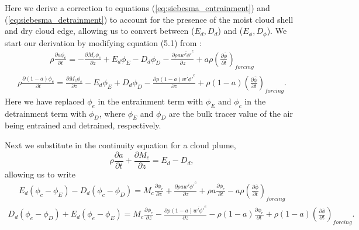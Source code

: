 \documentclass[draft,grl]{agutex}
\begin{document}
\begin{article}
Here we derive a correction to equations (\ref{eq:siebesma_entrainment}) and 
(\ref{eq:siebesma_detrainment}) to account for the presence of the moist cloud 
shell and dry cloud edge, allowing us to convert between ($E_d, D_d$) and 
($E_\phi, D_\phi$).  We start our derivation by modifying equation (5.1) from
\cite{Siebesma1995}:
\begin{eqnarray}
  \label{eq:entrainment_derivation_1}
    \rho \frac{\partial a \phi_c}{\partial t} 
    = - \frac{\partial M_c \phi_c}{\partial z} 
    + E_d \phi_E - D_d \phi_D
    - \frac{\partial \rho a \overline{w' \phi'}^c}{\partial z} 
    + a \rho \left(\frac{\partial \bar{\phi}}{\partial t}\right)_{forcing}
\end{eqnarray}
\begin{eqnarray}
  \label{eq:detrainment_derivation_1}
    \rho \frac{\partial (1 - a) \phi_e}{\partial t}
    = \frac{\partial M_c \phi_e}{\partial z} 
    - E_d \phi_E + D_d \phi_D
    - \frac{\partial \rho (1 - a) \overline{w' \phi'}^e}{\partial z} 
    + \rho (1 - a) \left(\frac{\partial \bar{\phi}}{\partial t}\right)_{forcing}.
\end{eqnarray}
Here we have replaced $\phi_e$ in the entrainment term with $\phi_E$ and 
$\phi_c$ in the detrainment term with $\phi_D$, where $\phi_E$ and $\phi_D$ are 
the bulk tracer value of the air being entrained and detrained, respectively.

Next we substitute in the continuity equation for a cloud plume,
\begin{equation}
   \label{eq:continuity}
   \rho \frac{\partial a}{\partial t} 
   + \frac{\partial M_c}{\partial z} = E_d - D_d,
\end{equation}
allowing us to write
\begin{eqnarray}
  \label{eq:entrainment_derivation_2}
    E_d (\phi_c - \phi_E) - D_d (\phi_c - \phi_D)
    = M_c \frac{\partial \phi_c}{\partial z}
    + \frac{\partial \rho a \overline{w' \phi'}^c}{\partial z} 
    + \rho a \frac{\partial \phi_c}{\partial t}
    - a \rho \left(\frac{\partial \bar{\phi}}{\partial t}\right)_{forcing}
\end{eqnarray}
\begin{eqnarray}
  \label{eq:detrainment_derivation_2}
    D_d (\phi_e - \phi_D) + E_d (\phi_e - \phi_E)
    = M_c \frac{\partial \phi_e}{\partial z}
    - \frac{\partial \rho (1 - a) \overline{w' \phi'}^e}{\partial z} 
    - \rho (1 - a) \frac{\partial \phi_e}{\partial t}
    + \rho (1 - a) \left(\frac{\partial \bar{\phi}}{\partial t}\right)_{forcing}.
\end{eqnarray}


\end{article}
\end{document}

